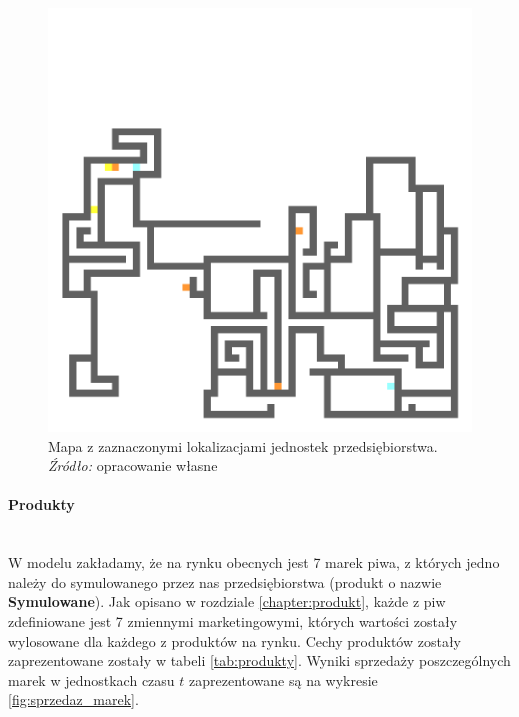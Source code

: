 \documentclass[polish, twoside, 12pt, a4paper]{article}
\theoremstyle{definition}
\theoremstyle{plain}
\theoremstyle{remark}
\begin{document}
\begin{figure}[hbt]
  \centering
    \includegraphics[width=\textwidth]{../mapy/firma.png}
  \captionsetup{margin=10pt,font=small,labelfont=bf,width=.8\textwidth}
  \caption[Mapa z zaznaczonymi lokalizacjami jednostek przedsiębiorstwa]{Mapa z zaznaczonymi lokalizacjami jednostek przedsiębiorstwa. \textit{Źródło:} opracowanie własne}\label{mapafirma}
\end{figure}

\paragraph{Produkty}\mbox{}\\
W modelu zakładamy, że na rynku obecnych jest 7 marek piwa, z których jedno należy do symulowanego przez nas przedsiębiorstwa (produkt o nazwie \textbf{Symulowane}). Jak opisano w rozdziale \ref{chapter:produkt}, każde z piw zdefiniowane jest 7 zmiennymi marketingowymi, których wartości zostały wylosowane dla każdego z produktów na rynku. Cechy produktów zostały zaprezentowane zostały w tabeli \ref{tab:produkty}. Wyniki sprzedaży poszczególnych marek w jednostkach czasu $t$ zaprezentowane są na wykresie \ref{fig:sprzedaz_marek}.
\end{document}
